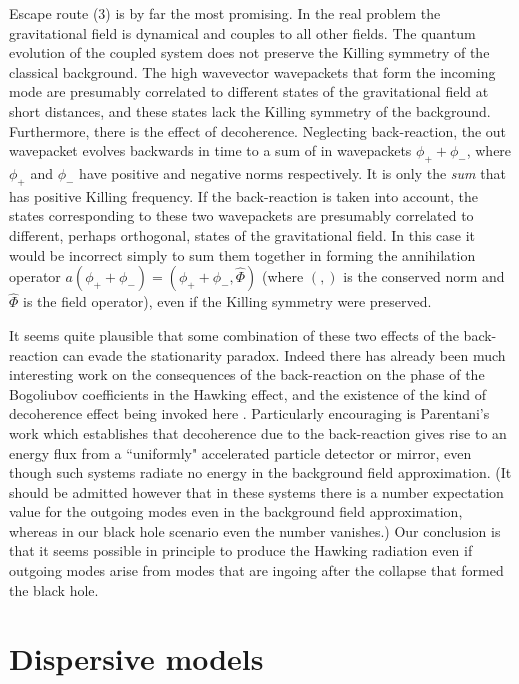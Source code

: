\documentclass[12pt]{article}
\begin{document}
Escape route (3) is by far the most promising. In the real problem the
gravitational field is dynamical and couples to all other fields.  The
quantum evolution of the coupled system does not preserve the Killing
symmetry of the classical background. The high wavevector wavepackets
that form the incoming mode are presumably correlated to different
states of the gravitational field at short distances, and these states
lack the Killing symmetry of the background. Furthermore, there is the
effect of decoherence. Neglecting back-reaction, the out wavepacket
evolves backwards in time to a sum of in wavepackets $\phi_+ + \phi_-$,
where $\phi_+$ and $\phi_-$ have positive and negative norms
respectively.  It is only the {\it sum} that has positive Killing
frequency.  If the back-reaction is taken into account, the states
corresponding to these two wavepackets are presumably correlated to
different, perhaps orthogonal, states of the gravitational field. In
this case it would be incorrect simply to sum them together in forming
the annihilation operator $a(\phi_+ + \phi_-)=(\phi_+ +
\phi_-,\hat{\Phi})$ (where $(,)$ is the conserved norm and $\hat{\Phi}$
is the field operator), even if the Killing symmetry were preserved.

It seems quite plausible that some combination of these two effects of
the back-reaction can evade the stationarity paradox. Indeed there has
already been much interesting work on the consequences of the
back-reaction on the phase of the Bogoliubov coefficients in the
Hawking effect, and the existence of the kind of decoherence effect
being invoked here \cite{backreac}. Particularly encouraging is
Parentani's work which establishes that decoherence due to the
back-reaction gives rise to an energy flux from a ``uniformly"
accelerated particle detector\cite{Pare-det} or mirror\cite{Pare-mir},
even though such systems radiate no energy in the background field
approximation\cite{FullDavi,Grove}. (It should be admitted however that
in these systems there is a number expectation value for the outgoing
modes even in the background field approximation, whereas in our black
hole scenario even the number vanishes.) Our conclusion is that it
seems possible in principle to produce the Hawking radiation even if
outgoing modes arise from modes that are ingoing after the collapse
that formed the black hole.

\section{Dispersive models}
\end{document}
